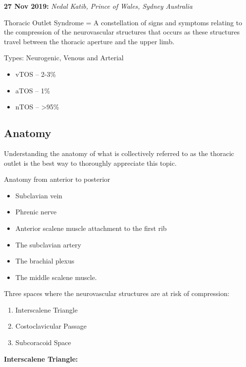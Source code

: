 \documentclass[
]{book}
\begin{document}
\textbf{27 Nov 2019:} \emph{Nedal Katib, Prince of Wales, Sydney Australia}

Thoracic Outlet Syndrome = A constellation of signs and symptoms
relating to the compression of the neurovascular structures that occurs
as these structures travel between the thoracic aperture and the upper
limb.

Types: Neurogenic, Venous and Arterial

\begin{itemize}
\item
  vTOS -- 2-3\%
\item
  aTOS -- 1\%
\item
  nTOS -- \textgreater95\% \citep{humphries124ThoracicOutlet2019}
\end{itemize}

\hypertarget{anatomy-1}{%
\subsection{Anatomy}\label{anatomy-1}}

Understanding the anatomy of what is collectively referred to as the
thoracic outlet is the best way to thoroughly appreciate this topic.

Anatomy from anterior to posterior

\begin{itemize}
\item
  Subclavian vein
\item
  Phrenic nerve
\item
  Anterior scalene muscle attachment to the first rib
\item
  The subclavian artery
\item
  The brachial plexus
\item
  The middle scalene muscle.
\end{itemize}

Three spaces where the neurovascular structures are at risk of
compression:

\begin{enumerate}
\def\labelenumi{\arabic{enumi}.}
\item
  Interscalene Triangle
\item
  Costoclavicular Passage\citep{garygwindAnatomicExposuresVascular2013}
\item
  Subcoracoid Space\citep{garygwindAnatomicExposuresVascular2013}
\end{enumerate}

\textbf{Interscalene Triangle:}
\end{document}
